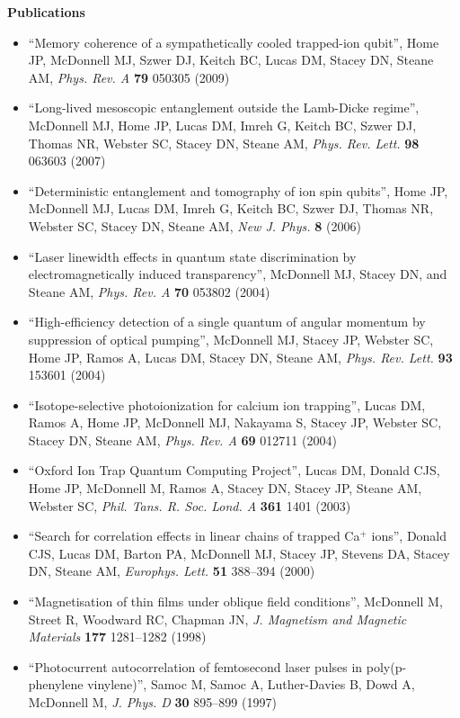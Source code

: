 \documentclass[10pt,a4paper]{article}
\begin{document}
%
{\large \textbf{Publications}}
\begin{itemize}
  \item ``Memory coherence of a sympathetically cooled trapped-ion
    qubit'', Home JP, McDonnell MJ, Szwer DJ, Keitch BC, Lucas DM, Stacey DN,
    Steane AM, \textit{Phys. Rev. A} \textbf{79} 050305 (2009)
  \item ``Long-lived mesoscopic entanglement outside the Lamb-Dicke
    regime'', McDonnell MJ, Home JP, Lucas DM, Imreh G, Keitch BC, Szwer DJ,
    Thomas NR, Webster SC, Stacey DN, Steane AM, \textit{Phys. Rev. Lett.}
    \textbf{98} 063603 (2007)
  \item ``Deterministic entanglement and tomography of ion spin qubits'',
    Home JP, McDonnell MJ, Lucas DM, Imreh G, Keitch BC, Szwer DJ, Thomas NR,
    Webster SC, Stacey DN, Steane AM, \textit{New J. Phys.} \textbf{8} (2006)
  \item ``Laser linewidth effects in quantum state discrimination by
    electromagnetically induced transparency'',  McDonnell MJ,
    Stacey DN, and Steane AM, \textit{Phys. Rev. A} \textbf{70}
    053802 (2004) 
  \item ``High-efficiency detection of a single quantum of angular
    momentum by suppression of optical pumping'',  McDonnell MJ,
    Stacey JP, Webster SC, Home JP, Ramos A, Lucas DM, Stacey DN,
    Steane AM, 
    \textit{Phys. Rev. Lett.} \textbf{93} 153601 (2004)
  \item ``Isotope-selective photoionization for calcium ion
    trapping'', Lucas DM, Ramos A, Home JP, McDonnell MJ, Nakayama S,
    Stacey JP, Webster SC, Stacey DN, Steane AM,
    \textit{Phys. Rev. A} \textbf{69} 012711 (2004)
  \item ``Oxford Ion Trap Quantum Computing Project'', Lucas DM, Donald CJS,
    Home JP, McDonnell M, Ramos A, Stacey DN, Stacey JP, Steane AM,
    Webster SC, \textit{Phil. Tans. R. Soc. Lond. A} \textbf{361} 1401
    (2003)
  \item ``Search for correlation effects in linear chains of trapped
    Ca$^{+}$ ions'', Donald CJS, Lucas DM, Barton PA, McDonnell MJ,
    Stacey JP, Stevens DA, Stacey DN, Steane AM,
    \textit{Europhys. Lett.} \textbf{51} 388--394 (2000)
  \item ``Magnetisation of thin films under oblique field
    conditions'', McDonnell M, Street R, Woodward RC, Chapman JN,
    \textit{J. Magnetism and Magnetic Materials} \textbf{177}
    1281--1282 (1998)
  \item ``Photocurrent autocorrelation of femtosecond laser pulses in
    poly(p-phenylene vinylene)'', Samoc M, Samoc A, Luther-Davies B,
    Dowd A, McDonnell M, \textit{J. Phys. D} \textbf{30} 895--899 (1997)
\end{itemize}
\end{document}
